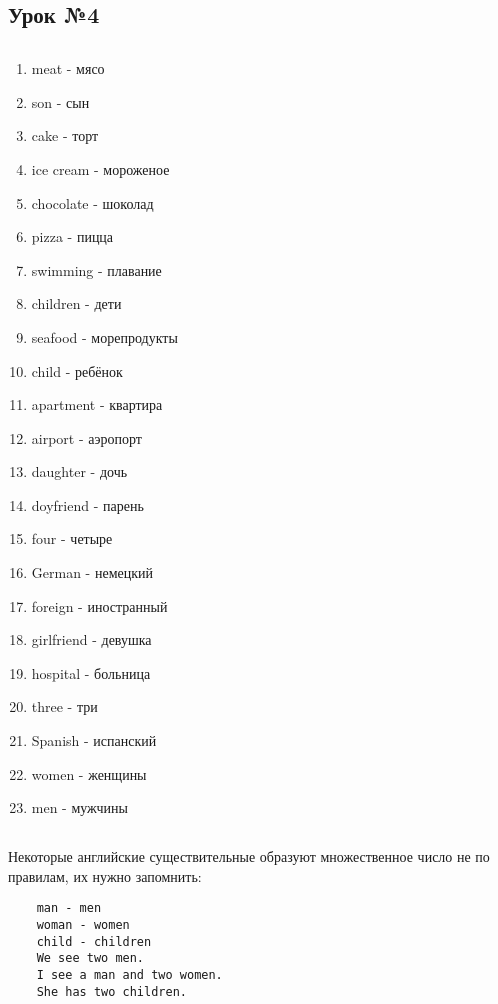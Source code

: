 \subsection{Урок №4}

\subsection*{}
\begin{multicols}{2}
    \begin{enumerate}\setlength{\itemsep}{0pt}
        \item meat - мясо
        \item son - сын
        \item cake - торт
        \item ice cream - мороженое
        \item chocolate - шоколад
        \item pizza - пицца
        \item swimming - плавание
        \item children - дети
        \item seafood - морепродукты
        \item child - ребёнок
        \item apartment - квартира
        \item airport - аэропорт
        \item daughter - дочь
        \item doyfriend - парень
        \item four - четыре
        \item German - немецкий
        \item foreign - иностранный
        \item girlfriend - девушка
        \item hospital - больница
        \item three - три
        \item Spanish - испанский
        \item women - женщины
        \item men - мужчины
    \end{enumerate}
\end{multicols}

\subsection*{}
Некоторые английские существительные образуют множественное число не по правилам, их нужно запомнить:
\begin{verbatim}
    man - men
    woman - women
    child - children
    We see two men.
    I see a man and two women.
    She has two children.
\end{verbatim}

